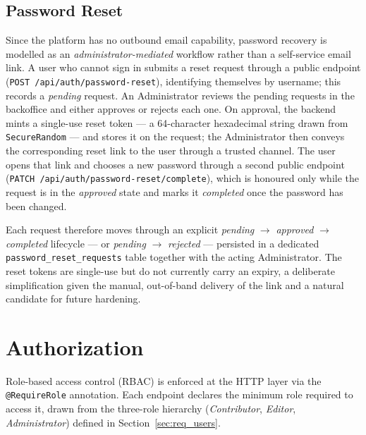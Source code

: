 \subsection{Password Reset} \label{sec:be_password_reset}

Since the platform has no outbound email capability, password recovery is modelled as
an \emph{administrator-mediated} workflow rather than a self-service email link. A user
who cannot sign in submits a reset request through a public endpoint
(\texttt{POST /api/auth/password-reset}), identifying themselves by username; this records
a \textit{pending} request. An Administrator reviews the pending requests in the
backoffice and either approves or rejects each one. On approval, the backend mints a
single-use reset token --- a 64-character hexadecimal string drawn from
\texttt{SecureRandom} --- and stores it on the request; the Administrator then conveys the
corresponding reset link to the user through a trusted channel. The user opens that link
and chooses a new password through a second public endpoint
(\texttt{PATCH /api/auth/password-reset/complete}), which is honoured only while the
request is in the \textit{approved} state and marks it \textit{completed} once the
password has been changed.

Each request therefore moves through an explicit \textit{pending} $\rightarrow$
\textit{approved} $\rightarrow$ \textit{completed} lifecycle --- or \textit{pending}
$\rightarrow$ \textit{rejected} --- persisted in a dedicated
\texttt{password\_reset\_requests} table together with the acting Administrator. The
reset tokens are single-use but do not currently carry an expiry, a deliberate
simplification given the manual, out-of-band delivery of the link and a natural candidate
for future hardening.

\section{Authorization} \label{sec:be_authorization}

Role-based access control (RBAC) is enforced at the HTTP layer via the
\texttt{@RequireRole} annotation. Each endpoint declares the minimum role required to
access it, drawn from the three-role hierarchy (\textit{Contributor}, \textit{Editor},
\textit{Administrator}) defined in Section~\ref{sec:req_users}.

